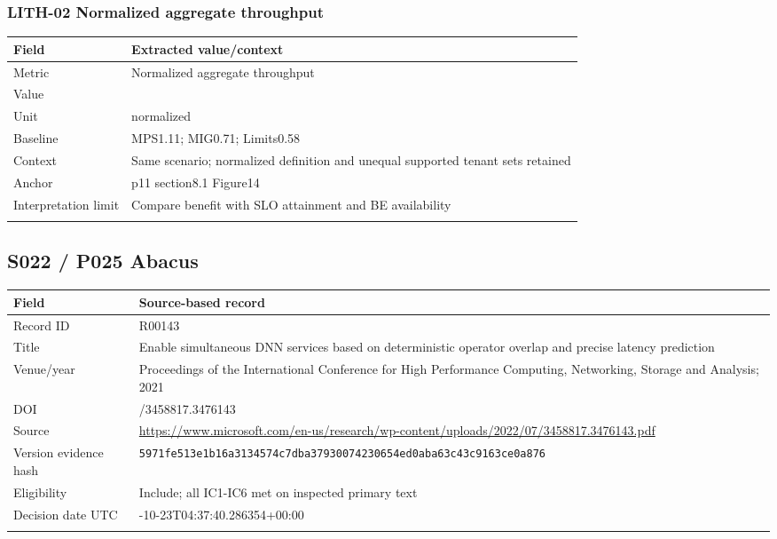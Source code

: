 \subsubsection*{LITH-02 Normalized aggregate throughput}
\begin{longtable}{>{\raggedright\arraybackslash}p{}>{\raggedright\arraybackslash}p{}}
\toprule
\textbf{Field} & \textbf{Extracted value/context}\\\midrule\endhead
Metric & Normalized aggregate throughput\\\addlinespace
Value & 1\\\addlinespace
Unit & normalized\\\addlinespace
Baseline & MPS1.11;\allowbreak{} MIG0.71;\allowbreak{} Limits0.58\\\addlinespace
Context & Same scenario;\allowbreak{} normalized definition and unequal supported tenant sets retained\\\addlinespace
Anchor & p11 section8.1 Figure14\\\addlinespace
Interpretation limit & Compare benefit with SLO attainment and BE availability\\\addlinespace
\bottomrule\end{longtable}
\clearpage\subsection{S022 / P025 Abacus}
\cite{s022}
\begin{longtable}{>{\raggedright\arraybackslash}p{}>{\raggedright\arraybackslash}p{}}
\toprule
\textbf{Field} & \textbf{Source-based record}\\\midrule\endhead
Record ID & R00143\\\addlinespace
Title & Enable simultaneous DNN services based on deterministic operator overlap and precise latency prediction\\\addlinespace
Venue/year & Proceedings of the International Conference for High Performance Computing,\allowbreak{} Networking,\allowbreak{} Storage and Analysis;\allowbreak{} 2021\\\addlinespace
DOI & 10.1145/3458817.3476143\\\addlinespace
Source & \url{https://www.microsoft.com/en-us/research/wp-content/uploads/2022/07/3458817.3476143.pdf}\\\addlinespace
Version evidence hash & \nolinkurl{5971fe513e1b16a3134574c7dba37930074230654ed0aba63c43c9163ce0a876}\\\addlinespace
Eligibility & Include;\allowbreak{} all IC1-IC6 met on inspected primary text\\\addlinespace
Decision date UTC & 2026-10-23T04:37:40.286354+00:00\\\addlinespace
\bottomrule\end{longtable}
